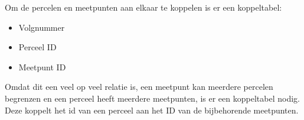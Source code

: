 Om de percelen en meetpunten aan elkaar te koppelen is er een koppeltabel:
\begin{itemize}
    \item Volgnummer
    \item Perceel ID
    \item Meetpunt ID
\end{itemize}

Omdat dit een veel op veel relatie is, een meetpunt kan meerdere percelen begrenzen en
een perceel heeft meerdere meetpunten, is er een koppeltabel nodig. Deze koppelt het id
van een perceel aan het ID van de bijbehorende meetpunten.
